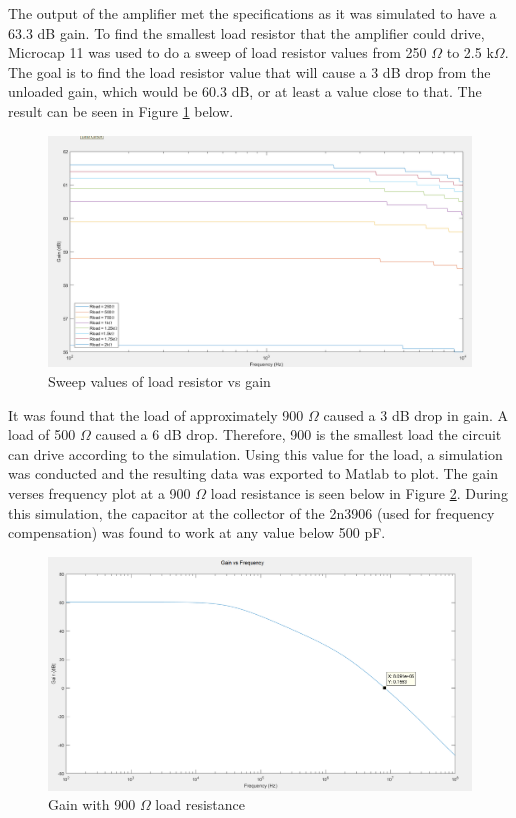 The output of the amplifier met the specifications as it was simulated to have a 63.3 dB gain. To find the smallest load resistor that the amplifier could drive, Microcap 11 was used to do a sweep of load resistor values from 250 $\Omega$ to 2.5 k$\Omega$. The goal is to find the load resistor value that will cause a 3 dB drop from the unloaded gain, which would be 60.3 dB, or at least a value close to that. The result can be seen in Figure \ref{fig:loadsweep} below.

\begin{figure}[H]
	\centering
	\includegraphics[width=0.7\linewidth]{CircuitDevelopment/varyrload.png}
	\caption{Sweep values of load resistor vs gain}
	\label{fig:loadsweep}
\end{figure}


It was found that the load of approximately 900 $\Omega$ caused a 3 dB drop in gain. A load of 500 $\Omega$ caused a 6 dB drop. Therefore, 900 is the smallest load the circuit can drive according to the simulation. Using this value for the load, a simulation was conducted and the resulting data was exported to Matlab to plot. The gain verses frequency plot at a 900 $\Omega$ load resistance is seen below in Figure \ref{fig:loadgain}. During this simulation, the capacitor at the collector of the 2n3906 (used for frequency compensation) was found to work at any value below 500 pF. 

\begin{figure}[H]
	\centering
	\includegraphics[width=0.7\linewidth]{CircuitDevelopment/gainfreqsim.png}
	\caption{Gain with 900 $\Omega$ load resistance}
	\label{fig:loadgain}
\end{figure}

